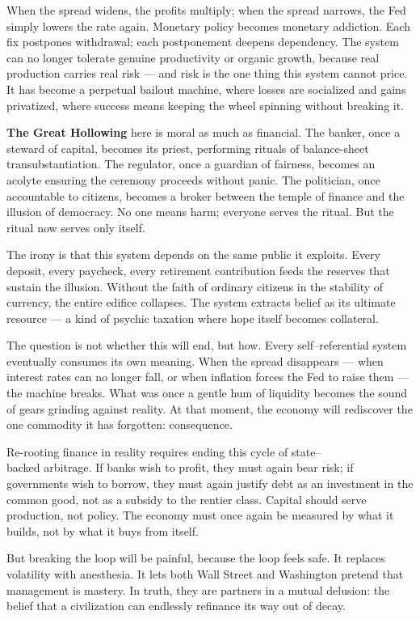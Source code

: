 \documentclass[11pt,twoside]{book}
\begin{document}
When the spread widens, the profits multiply; when the spread narrows, the Fed simply lowers the rate again.  
Monetary policy becomes monetary addiction.  
Each fix postpones withdrawal; each postponement deepens dependency.  
The system can no longer tolerate genuine productivity or organic growth, because real production carries real risk — and risk is the one thing this system cannot price.  
It has become a perpetual bailout machine, where losses are socialized and gains privatized, where success means keeping the wheel spinning without breaking it.

\textbf{The Great Hollowing} here is moral as much as financial.  
The banker, once a steward of capital, becomes its priest, performing rituals of balance-sheet transubstantiation.  
The regulator, once a guardian of fairness, becomes an acolyte ensuring the ceremony proceeds without panic.  
The politician, once accountable to citizens, becomes a broker between the temple of finance and the illusion of democracy.  
No one means harm; everyone serves the ritual.  
But the ritual now serves only itself.

The irony is that this system depends on the same public it exploits.  
Every deposit, every paycheck, every retirement contribution feeds the reserves that sustain the illusion.  
Without the faith of ordinary citizens in the stability of currency, the entire edifice collapses.  
The system extracts belief as its ultimate resource — a kind of psychic taxation where hope itself becomes collateral.

The question is not whether this will end, but how.  
Every self–referential system eventually consumes its own meaning.  
When the spread disappears — when interest rates can no longer fall, or when inflation forces the Fed to raise them — the machine breaks.  
What was once a gentle hum of liquidity becomes the sound of gears grinding against reality.  
At that moment, the economy will rediscover the one commodity it has forgotten: consequence.

Re-rooting finance in reality requires ending this cycle of state–\\backed arbitrage.  
If banks wish to profit, they must again bear risk; if governments wish to borrow, they must again justify debt as an investment in the common good, not as a subsidy to the rentier class. Capital should serve production, not policy.  
The economy must once again be measured by what it builds, not by what it buys from itself.

But breaking the loop will be painful, because the loop feels safe.  
It replaces volatility with anesthesia.  
It lets both Wall Street and Washington pretend that management is mastery.  
In truth, they are partners in a mutual delusion: the belief that a civilization can endlessly refinance its way out of decay.
\end{document}
